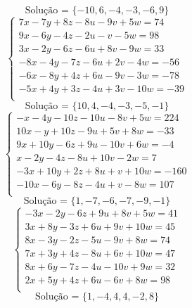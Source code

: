 \documentclass[12pt,oneside,a4paper]{article}
\begin{document}
\begin{equation*}
\text{Solução = }\{-10,6,-4,-3,-6,9\}
\end{equation*}
\vspace{\baselineskip}
\begin{equation*}
\begin{cases}
7x-7y+8z-8u-9v+5w=74 \\
9x-6y-4z-2u-v-5w=98 \\
3x-2y-6z-6u+8v-9w=33 \\
-8x-4y-7z-6u+2v-4w=-56 \\
-6x-8y+4z+6u-9v-3w=-78 \\
-5x+4y+3z-4u+3v-10w=-39 \\
\end{cases}
\end{equation*}
\begin{equation*}
\text{Solução = }\{10,4,-4,-3,-5,-1\}
\end{equation*}
\vspace{\baselineskip}
\begin{equation*}
\begin{cases}
-x-4y-10z-10u-8v+5w=224 \\
10x-y+10z-9u+5v+8w=-33 \\
9x+10y-6z+9u-10v+6w=-4 \\
x-2y-4z-8u+10v-2w=7 \\
-3x+10y+2z+8u+v+10w=-160 \\
-10x-6y-8z-4u+v-8w=107 \\
\end{cases}
\end{equation*}
\begin{equation*}
\text{Solução = }\{1,-7,-6,-7,-9,-1\}
\end{equation*}
\vspace{\baselineskip}
\begin{equation*}
\begin{cases}
-3x-2y-6z+9u+8v+5w=41 \\
3x+8y-3z+6u+9v+10w=45 \\
8x-3y-2z-5u-9v+8w=74 \\
7x+3y+4z-8u+6v+10w=47 \\
8x+6y-7z-4u-10v+9w=32 \\
2x+5y+4z+6u-6v+8w=98 \\
\end{cases}
\end{equation*}
\begin{equation*}
\text{Solução = }\{1,-4,4,4,-2,8\}
\end{equation*}
\end{document}
